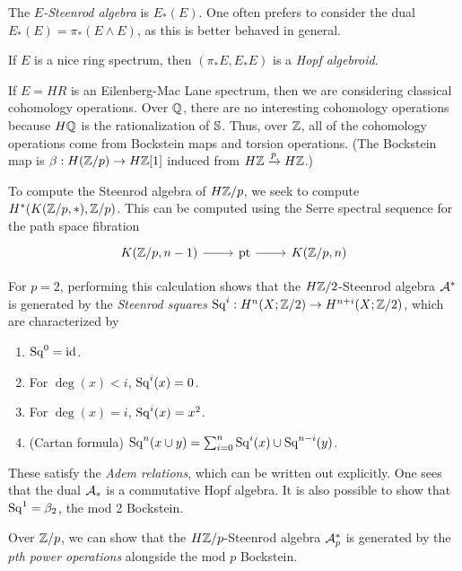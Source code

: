 \documentclass{article}
\begin{document}
\begin{dfn}
	The \emph{$E$-Steenrod algebra} is $E_*(E)$.
	One often prefers to consider the dual $E_*(E) = \pi_*(E \wedge E)$, as this is better behaved in general.
\end{dfn}

\begin{thm}
	If $E$ is a nice ring spectrum, then $(\pi_* E, E_* E)$ is a \emph{Hopf algebroid}.
\end{thm}

\begin{ex}
	If $E = HR$ is an Eilenberg-Mac Lane spectrum, then we are considering classical cohomology operations.
	Over $\mathbb{Q}$, there are no interesting cohomology operations because $H\mathbb{Q}$ is the rationalization of $\mathbb{S}$.
	Thus, over $\mathbb{Z}$, all of the cohomology operations come from Bockstein maps and torsion operations.
	(The Bockstein map is $\beta: H(\mathbb{Z}/p) \to H\mathbb{Z}[1]$ induced from $H\mathbb{Z} \xrightarrow{p} H\mathbb{Z}$.)
	
	To compute the Steenrod algebra of $H\mathbb{Z}/p$, we seek to compute $H^*(K(\mathbb{Z}/p, *), \mathbb{Z}/p)$.
	This can be computed using the Serre spectral sequence for the path space fibration
	\[
		\begin{tikzcd}
			K(\ZZ/p, n - 1) \rar & \pt \rar & K(\ZZ/p, n)
		\end{tikzcd}
	\]

	For $p = 2$, performing this calculation shows that the $H\mathbb{Z}/2$-Steenrod algebra $\mathcal{A}^*$ is generated by the \emph{Steenrod squares} $\mathrm{Sq}^i: H^n(X; \mathbb{Z}/2) \to H^{n+i}(X; \mathbb{Z}/2)$, which are characterized by
	\begin{enumerate}
		\item $\mathrm{Sq}^0 = \operatorname{\operatorname{id}}$.
		\item For $\deg(x) < i$, $\mathrm{Sq}^i(x) = 0$.
		\item For $\deg(x) = i$, $\mathrm{Sq}^i(x) = x^2$.
		\item (Cartan formula) $\mathrm{Sq}^n(x \cup y) = \sum_{i=0}^n \mathrm{Sq}^i(x) \cup \mathrm{Sq}^{n-i}(y)$.
	\end{enumerate}
	These satisfy the \emph{Adem relations}, which can be written out explicitly.
	One sees that the dual $\mathcal{A}_*$ is a commutative Hopf algebra.
	It is also possible to show that $\mathrm{Sq}^1 = \beta_2$, the mod 2 Bockstein.

	Over $\mathbb{Z}/p$, we can show that the $H\mathbb{Z}/p$-Steenrod algebra $\mathcal{A}_p^*$ is generated by the \emph{$p$th power operations} alongside the mod $p$ Bockstein.
\end{ex}
\end{document}
